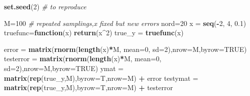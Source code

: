 \documentclass[]{article}
\newenvironment{Shaded}{\begin{snugshade}}{\end{snugshade}}
\newcommand{\KeywordTok}[1]{\textcolor[rgb]{0.13,0.29,0.53}{\textbf{#1}}}
\newcommand{\DataTypeTok}[1]{\textcolor[rgb]{0.13,0.29,0.53}{#1}}
\newcommand{\DecValTok}[1]{\textcolor[rgb]{0.00,0.00,0.81}{#1}}
\newcommand{\FloatTok}[1]{\textcolor[rgb]{0.00,0.00,0.81}{#1}}
\newcommand{\StringTok}[1]{\textcolor[rgb]{0.31,0.60,0.02}{#1}}
\newcommand{\CommentTok}[1]{\textcolor[rgb]{0.56,0.35,0.01}{\textit{#1}}}
\newcommand{\OtherTok}[1]{\textcolor[rgb]{0.56,0.35,0.01}{#1}}
\newcommand{\ControlFlowTok}[1]{\textcolor[rgb]{0.13,0.29,0.53}{\textbf{#1}}}
\newcommand{\OperatorTok}[1]{\textcolor[rgb]{0.81,0.36,0.00}{\textbf{#1}}}
\newcommand{\NormalTok}[1]{#1}
\begin{document}
\begin{Shaded}
\begin{Highlighting}[]
\KeywordTok{set.seed}\NormalTok{(}\DecValTok{2}\NormalTok{) }\CommentTok{# to reproduce}

\NormalTok{M=}\DecValTok{100} \CommentTok{# repeated samplings,x fixed but new errors}
\NormalTok{nord=}\DecValTok{20}
\NormalTok{x =}\StringTok{ }\KeywordTok{seq}\NormalTok{(}\OperatorTok{-}\DecValTok{2}\NormalTok{, }\DecValTok{4}\NormalTok{, }\FloatTok{0.1}\NormalTok{)}
\NormalTok{truefunc=}\ControlFlowTok{function}\NormalTok{(x) }\KeywordTok{return}\NormalTok{(x}\OperatorTok{^}\DecValTok{2}\NormalTok{)}
\NormalTok{true_y =}\StringTok{ }\KeywordTok{truefunc}\NormalTok{(x)}

\NormalTok{error =}\StringTok{ }\KeywordTok{matrix}\NormalTok{(}\KeywordTok{rnorm}\NormalTok{(}\KeywordTok{length}\NormalTok{(x)}\OperatorTok{*}\NormalTok{M, }\DataTypeTok{mean=}\DecValTok{0}\NormalTok{, }\DataTypeTok{sd=}\DecValTok{2}\NormalTok{),}\DataTypeTok{nrow=}\NormalTok{M,}\DataTypeTok{byrow=}\OtherTok{TRUE}\NormalTok{)}
\NormalTok{testerror =}\StringTok{ }\KeywordTok{matrix}\NormalTok{(}\KeywordTok{rnorm}\NormalTok{(}\KeywordTok{length}\NormalTok{(x)}\OperatorTok{*}\NormalTok{M, }\DataTypeTok{mean=}\DecValTok{0}\NormalTok{, }\DataTypeTok{sd=}\DecValTok{2}\NormalTok{),}\DataTypeTok{nrow=}\NormalTok{M,}\DataTypeTok{byrow=}\OtherTok{TRUE}\NormalTok{)}
\NormalTok{ymat =}\StringTok{ }\KeywordTok{matrix}\NormalTok{(}\KeywordTok{rep}\NormalTok{(true_y,M),}\DataTypeTok{byrow=}\NormalTok{T,}\DataTypeTok{nrow=}\NormalTok{M) }\OperatorTok{+}\StringTok{ }\NormalTok{error}
\NormalTok{testymat =}\StringTok{ }\KeywordTok{matrix}\NormalTok{(}\KeywordTok{rep}\NormalTok{(true_y,M),}\DataTypeTok{byrow=}\NormalTok{T,}\DataTypeTok{nrow=}\NormalTok{M) }\OperatorTok{+}\StringTok{ }\NormalTok{testerror}


\end{Highlighting}
\end{Shaded}
\end{document}
